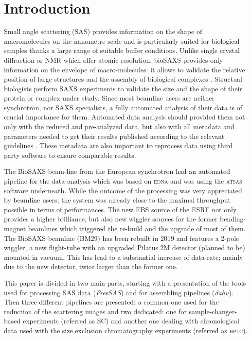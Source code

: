 \documentclass[preprint]{iucr}              %
\begin{document}
\section{Introduction}
Small angle scattering (SAS) provides information on the shape of macromolecules on the nanometre scale and is  
particularly suited for biological samples thanks a large range of suitable buffer conditions.
Unlike single crystal diffraction or NMR which offer atomic resolution, bioSAXS provides only information on the envelope of macro-molecules: it allows to validate the relative position of large structures and the assembly of biological complexes \cite{biosaxs_rev2018}. 
Structual biologists perform SAXS experiments to validate the size and the shape of their protein or complex under study. 
Since most beamline users are neither synchrotron, nor SAXS specialists, a fully automated analysis of their data is of crucial importance for them. 
Automated data analysis should provided them not only with the reduced and pre-analyzed data, but also with all metadata and parameters needed to get their results published according to the relevant guidelines \cite{guidelines_2017}.
These metadata are also important to reprocess data using third party software to ensure comparable results. 

The BioSAXS beam-line from the European synchrotron \cite{BM29paper} had an automated pipeline for the data-analysis which was based on \textsc{edna} \cite{edna} and was using the \textsc{atsas} \cite{ATSAS2} software underneath. 
While the outcome of the processing was very appreciated by beamline users, the system was already close to the maximal throughput possible in terms of performances. 
The new EBS source \cite{EBS} of the ESRF not only provides a higher brilliance, but also new wiggler sources for the former bending-magnet beamlines which triggered the re-build and the upgrade of most of them. 
The BioSAXS beamline (BM29) has been rebuilt in 2019 and features a  2-pole wiggler, a new flight-tube with an upgraded  Pilatus 2M detector (planned to be) mounted in vacuum. 
This has lead to a substantial increase of data-rate; mainly due to the new detector, twice larger than the former one. 

This paper is divided in two main parts, starting with a presentation of the tools used for 
processing SAS data (\textit{FreeSAS}) and for assembling pipelines (\textit{dahu}).
Then three different pipelines are presented: a common one used for the reduction of the scattering images and two dedicated: one for sample-changer-based experiments (referred as SC) and another one dealing with chronological data used with the size exclusion chromatography experiments (referred as \textsc{hplc}).
\end{document}
